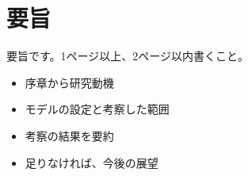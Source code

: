 \documentclass[main.tex]{subfiles}
\begin{document}
\section*{要旨}

要旨です。1ページ以上、2ページ以内書くこと。


\begin{itemize}
    \item 序章から研究動機
    \item モデルの設定と考察した範囲
    \item 考察の結果を要約
    \item 足りなければ、今後の展望
  \end{itemize}
\end{document}
